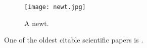 \begin{figure}[!h]
    \texttt{[image: newt.jpg]}
    \caption{A newt.}
\end{figure}

One of the oldest citable scientific papers is \cite{van1677concerning}.

